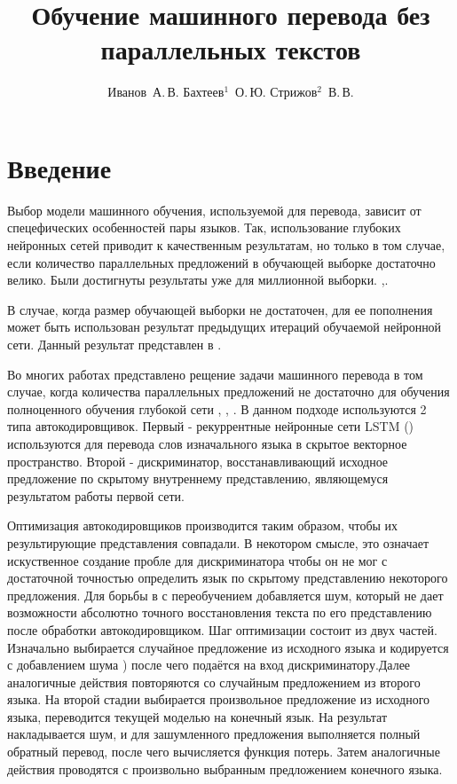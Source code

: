 \documentclass[12pt,twoside]{article}
\title
    [Обучение машинного перевода без параллельных текстов] %
    {Обучение машинного перевода без параллельных текстов}
\author
    [Иванов~А.\,В. Бахтеев$^1$~О.\,Ю.  Стрижов$^2$~В.\,В.] %
{Иванов~А.\,В. Бахтеев$^1$~О.\,Ю.  Стрижов$^2$~В.\,В.} %
[Иванов~А.\,В. Бахтеев$^1$~О.\,Ю.  Стрижов$^2$~В.\,В.] %
\begin{document}
\maketitle

\section{Введение}

Выбор модели машинного обучения, используемой для перевода, зависит от спецефических особенностей пары языков. Так, использование глубоких нейронных сетей приводит к качественным результатам, но только в том случае, если количество параллельных предложений в обучающей выборке достаточно велико. Были достигнуты результаты уже для миллионной выборки. \cite{zou2013bilingual},\cite{cho2014properties}. 

В случае, когда размер обучающей выборки не достаточен, для ее пополнения может быть использован результат предыдущих итераций обучаемой нейронной сети. Данный результат представлен в \cite{bertoldi2009domain}.

Во многих работах представлено рещение задачи машинного перевода в том случае, когда количества параллельных предложений не достаточно для обучения полноценного обучения глубокой сети \cite{wu2016google}, \cite{sutskever2014sequence}, \cite{bahdanau2014neural}. В данном подходе используются 2 типа автокодировщивок. Первый - рекуррентные нейронные сети LSTM (\cite{graves2005framewise}) используются для перевода слов изначального языка в скрытое векторное пространство. Второй - дискриминатор, восстанавливающий исходное предложение по скрытому внутреннему представлению, являющемуся результатом работы первой сети.

Оптимизация автокодировщиков производится таким образом, чтобы их результирующие представления совпадали. В некотором смысле, это означает искуственное создание пробле для дискриминатора чтобы он не мог с достаточной точностью определить язык по скрытому представлению некоторого предложения. Для борьбы в с переобучением добавляется шум, который не дает возможности абсолютно точного восстановления текста по его представлению после обработки автокодировщиком. Шаг оптимизации состоит из двух частей. Изначально выбирается случайное предложение из исходного языка и кодируется с добавлением шума \cite{kimimproving}) после чего подаётся на вход дискриминатору.Далее аналогичные действия повторяются со случайным предложением из второго языка. На второй стадии выбирается произвольное предложение из исходного языка, переводится текущей моделью на конечный язык. На результат накладывается шум, и для зашумленного предложения выполняется полный обратный перевод, после чего вычисляется функция потерь. Затем аналогичные действия проводятся с произвольно выбранным предложением конечного языка.
\end{document}
